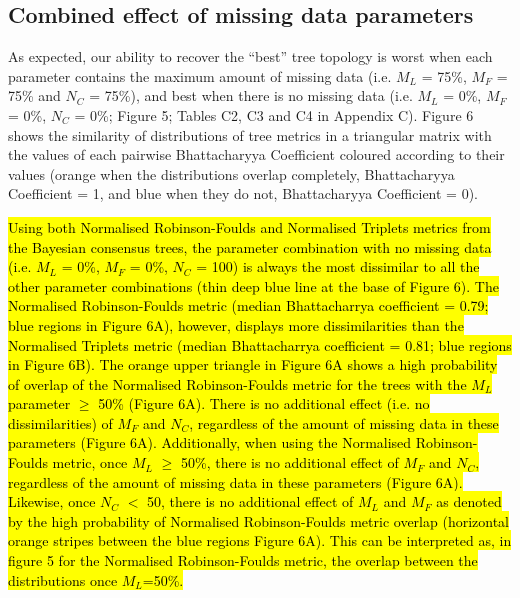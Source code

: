 \documentclass[12pt,letterpaper]{article}
\begin{document}
\subsection{Combined effect of missing data parameters}
As expected, our ability to recover the ``best'' tree topology is worst when each parameter contains the maximum amount of missing data (i.e. $M_{L}$ = 75\%, $M_{F}$ = 75\% and $N_{C}$ = 75\%), and best when there is no missing data (i.e. $M_{L}$ = 0\%, $M_{F}$ = 0\%, $N_{C}$ = 0\%; Figure 5; Tables C2, C3 and C4 in Appendix C).
Figure 6 shows the similarity of distributions of tree metrics in a triangular matrix with the values of each pairwise Bhattacharyya Coefficient coloured according to their values (orange when the distributions overlap completely, Bhattacharyya Coefficient = 1, and blue when they do not, Bhattacharyya Coefficient = 0). 


\hl{Using both Normalised Robinson-Foulds and Normalised Triplets metrics from the Bayesian consensus trees, the parameter combination with no missing data (i.e. $M_{L}$ = 0\%, $M_{F}$ = 0\%, $N_{C}$ = 100) is always the most dissimilar to all the other parameter combinations (thin deep blue line at the base of Figure 6).
The Normalised Robinson-Foulds metric (median Bhattacharrya coefficient = 0.79; blue regions in Figure 6A), however, displays more dissimilarities than the Normalised Triplets metric (median Bhattacharrya coefficient = 0.81; blue regions in Figure 6B).
The orange upper triangle in Figure 6A shows a high probability of overlap of the Normalised Robinson-Foulds metric for the trees with the $M_{L}$ parameter $\geq$ 50\% (Figure 6A).
There is no additional effect (i.e. no dissimilarities) of $M_{F}$ and $N_{C}$, regardless of the amount of missing data in these parameters (Figure 6A).
Additionally, when using the Normalised Robinson-Foulds metric, once $M_{L}$ $\geq$ 50\%, there is no additional effect of $M_{F}$ and $N_{C}$, regardless of the amount of missing data in these parameters (Figure 6A).
Likewise, once $N_{C}$ $<$ 50, there is no additional effect of $M_{L}$ and $M_{F}$ as denoted by the high probability of Normalised Robinson-Foulds metric overlap (horizontal orange stripes between the blue regions Figure 6A).
This can be interpreted as, in figure 5 for the Normalised Robinson-Foulds metric, the overlap between the distributions once $M_L$=50\%.}
\end{document}
